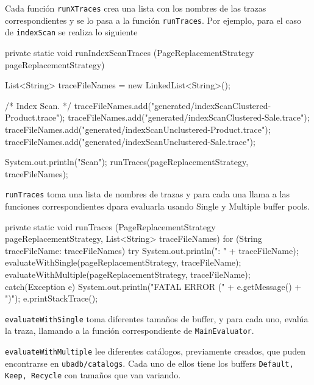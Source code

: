 Cada función \texttt{runXTraces} crea una lista con los nombres de las trazas
correspondientes y se lo pasa a la función \texttt{runTraces}.
Por ejemplo, para el caso de \texttt{indexScan} se realiza lo siguiente

\newpage

\vspace*{-0.2cm}

\begin{verbatimtab}[4]
private static void runIndexScanTraces
	(PageReplacementStrategy pageReplacementStrategy)
{
	List<String> traceFileNames = new LinkedList<String>();
	
	/* Index Scan. */
	traceFileNames.add("generated/indexScanClustered-Product.trace");
	traceFileNames.add("generated/indexScanClustered-Sale.trace");
	traceFileNames.add("generated/indexScanUnclustered-Product.trace");
	traceFileNames.add("generated/indexScanUnclustered-Sale.trace");
	
	System.out.println("\nIndex Scan\n");		
	runTraces(pageReplacementStrategy, traceFileNames);
}
\end{verbatimtab}

\texttt{runTraces} toma una lista de nombres de trazas y para cada una llama
a las funciones correspondientes dpara evaluarla usando Single y Multiple buffer pools.

\begin{verbatimtab}[4]
private static void runTraces
	(PageReplacementStrategy pageReplacementStrategy, List<String> traceFileNames)
{
	for (String traceFileName: traceFileNames)
	{
		try
		{				
			System.out.println("\nTrace: " + traceFileName);
			evaluateWithSingle(pageReplacementStrategy, traceFileName);
			evaluateWithMultiple(pageReplacementStrategy, traceFileName);
		}
		catch(Exception e)
		{
			System.out.println("FATAL ERROR (" + e.getMessage() + ")");
			e.printStackTrace();
		}
	}
}
\end{verbatimtab}

\texttt{evaluateWithSingle} toma diferentes tamaños de buffer, y para
cada uno, evalúa la traza, llamando a la función correspondiente
de \texttt{MainEvaluator}.

\newpage

\texttt{evaluateWithMultiple} lee diferentes catálogos, previamente
creados, que puden encontrarse en \texttt{ubadb/catalogs}. 
Cada uno de ellos tiene los buffers \texttt{Default, Keep, Recycle}
con tamaños que van variando.

\vspace*{0.5cm}

